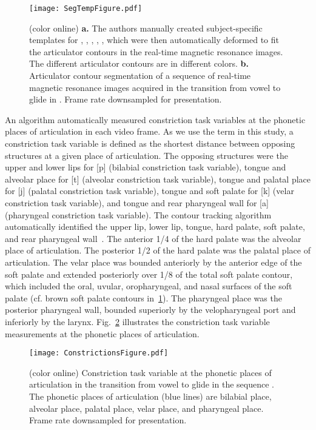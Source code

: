 \documentclass[reprint]{JASAnew}\usepackage[]{graphicx}\usepackage[]{color}
\begin{document}
\begin{figure}

\texttt{[image: SegTempFigure.pdf]}

\caption{(color online) {\bf a.} The authors manually created subject-specific templates for \textipa{[a]}, \textipa{[i]}, \textipa{[p]}, \textipa{[t]}, \textipa{[k]}, which were then automatically deformed to fit the articulator contours in the real-time magnetic resonance images. The different articulator contours are in different colors.
{\bf b.} Articulator contour segmentation of a sequence of real-time magnetic resonance images acquired in the transition from vowel \textipa{[a]} to glide \textipa{[j]} in \textipa{[aja]}. Frame rate downsampled for presentation.}
\label{fig:segtemp}
\end{figure}



An algorithm automatically measured constriction task variables at the phonetic places of articulation in each video frame. 
%
As we use the term in this study, a constriction task variable is defined as the shortest distance between opposing structures at a given place of articulation. 
%
The opposing structures were the upper and lower lips for [p] (bilabial constriction task variable), tongue and alveolar place for [t] (alveolar constriction task variable), tongue and palatal place for [j] (palatal constriction task variable), tongue and soft palate for [k] (velar constriction task variable), and tongue and rear pharyngeal wall for [a] (pharyngeal constriction task variable). 
%
The contour tracking algorithm automatically identified the upper lip, lower lip, tongue, hard palate, soft palate, and rear pharyngeal wall~\citep{bresch2009region}.  
%
The anterior \num{1/4} of the hard palate was the alveolar place of articulation. 
%
The posterior \num{1/2} of the hard palate was the palatal place of articulation.
%
The velar place was bounded anteriorly by the anterior edge of the soft palate and extended posteriorly over \num{1/8} of the total soft palate contour, which included the oral, uvular, oropharyngeal, and nasal surfaces of the soft palate (cf. brown soft palate contours in~\ref{fig:segtemp}).
%
The pharyngeal place was the posterior pharyngeal wall, bounded superiorly by the velopharyngeal port and inferiorly by the larynx. 
%
Fig.~\ref{fig:constrictions} illustrates the constriction task variable measurements at the phonetic places of articulation.


\begin{figure}

\texttt{[image: ConstrictionsFigure.pdf]}

\caption{(color online) Constriction task variable at the phonetic places of articulation in the transition from vowel \textipa{[a]} to glide \textipa{[j]} in the sequence \textipa{[aja]}. The phonetic places of articulation (blue lines) are bilabial place, alveolar place, palatal place, velar place, and pharyngeal place. Frame rate downsampled for presentation.}
\label{fig:constrictions}
\end{figure}
\end{document}
